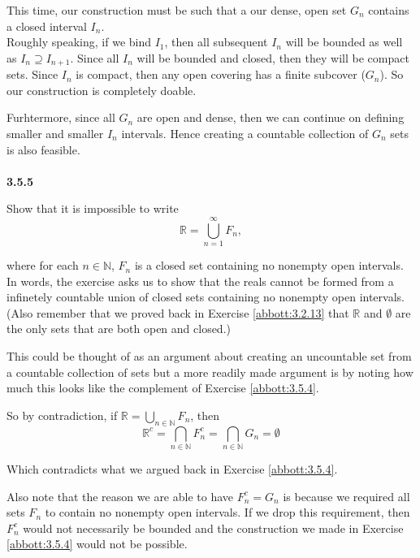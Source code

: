 This time, our construction must be such that a our dense, open set $G_n$ contains a closed interval $I_n$.
\\

Roughly speaking, if we bind $I_1$, then all subsequent $I_n$ will be bounded as well as $I_n \supseteq I_{n+1}$.
Since all $I_n$ will be bounded and closed, then they will be compact sets.
Since $I_n$ is compact, then any open covering has a finite subcover ($G_n$).
So our construction is completely doable.

Furhtermore, since all $G_n$ are open and dense, then we can continue on defining smaller and smaller
$I_n$ intervals.
Hence creating a countable collection of $G_n$ sets is also feasible.
\\~\\



\textbf{3.5.5}

Show that it is impossible to write
$$
\mathbb{R} = \bigcup^{\infty}_{n=1} F_n,
$$

where for each $n\in\mathbb{N}$, $F_n$ is a closed set containing no nonempty open intervals.
\\

In words, the exercise asks us to show that the reals cannot be formed from a infinetely countable
union of closed sets containing no nonempty open intervals.
(Also remember that we proved back in Exercise \ref{abbott:3.2.13} that $\mathbb{R}$ and $\emptyset$
are the only sets that are both open and closed.)

This could be thought of as an argument about creating an uncountable set from a countable collection of sets
but a more readily made argument is by noting how much this looks like the complement of
Exercise \ref{abbott:3.5.4}.


So by contradiction, if $\mathbb{R} = \bigcup_{n\in\mathbb{N}} F_n$,
then
$$
\mathbb{R}^c = \bigcap_{n\in\mathbb{N}} F_{n}^{c} = \bigcap_{n\in\mathbb{N}} G_{n} = \emptyset
$$

Which contradicts what we argued back in Exercise \ref{abbott:3.5.4}.

Also note that the reason we are able to have $F_{n}^{c} = G_n$ is because we required all sets $F_n$
to contain no nonempty open intervals.
If we drop this requirement, then $F_{n}^{c}$ would not necessarily be bounded and the construction
we made in Exercise \ref{abbott:3.5.4} would not be possible.
\\~\\



